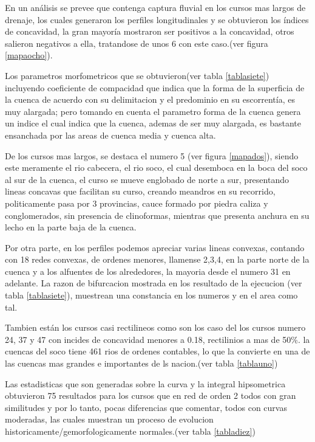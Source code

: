 \documentclass[11pt,]{article}
\begin{document}
En un análisis se prevee que contenga captura fluvial en los cursos mas
largos de drenaje, los cuales generaron los perfiles longitudinales y se
obtuvieron los índices de concavidad, la gran mayoría mostraron ser
positivos a la concavidad, otros salieron negativos a ella, tratandose
de unos 6 con este caso.(ver figura \ref{mapaocho}).

Los parametros morfometricos que se obtuvieron(ver tabla
\ref{tablasiete}) incluyendo coeficiente de compacidad que indica que la
forma de la superficia de la cuenca de acuerdo con su delimitacion y el
predominio en su escorrentía, es muy alargada; pero tomando en cuenta el
parametro forma de la cuenca genera un indice el cual indica que la
cuenca, ademas de ser muy alargada, es bastante ensanchada por las areas
de cuenca media y cuenca alta.

De los cursos mas largos, se destaca el numero 5 (ver figura
\ref{mapados}), siendo este meramente el rio cabecera, el rio soco, el
cual desemboca en la boca del soco al sur de la cuenca, el curso se
mueve englobado de norte a sur, presentando lineas concavas que
facilitan su curso, creando meandros en su recorrido, politicamente pasa
por 3 provincias, cauce formado por piedra caliza y conglomerados, sin
presencia de clinoformas, mientras que presenta anchura en su lecho en
la parte baja de la cuenca.

Por otra parte, en los perfiles podemos apreciar varias lineas convexas,
contando con 18 redes convexas, de ordenes menores, llamense 2,3,4, en
la parte norte de la cuenca y a los alfuentes de los alrededores, la
mayoria desde el numero 31 en adelante. La razon de bifurcacion mostrada
en los resultado de la ejecucion (ver tabla \ref{tablasiete}), muestrean
una constancia en los numeros y en el area como tal.

Tambien están los cursos casi rectilineos como son los caso del los
cursos numero 24, 37 y 47 con incides de concavidad menores a 0.18,
rectilinios a mas de 50\%. la cuencas del soco tiene 461 rios de ordenes
contables, lo que la convierte en una de las cuencas mas grandes e
importantes de ls nacion.(ver tabla \ref{tablauno})

Las estadisticas que son generadas sobre la curva y la integral
hipsometrica obtuvieron 75 resultados para los cursos que en red de
orden 2 todos con gran similitudes y por lo tanto, pocas diferencias que
comentar, todos con curvas moderadas, las cuales muestran un proceso de
evolucion historicamente/gemorfologicamente normales.(ver tabla
\ref{tabladiez})
\end{document}
